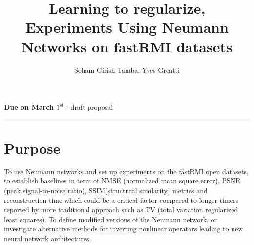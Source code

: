 \documentclass[12pt,twoside]{article}
\title{Learning to regularize, Experiments Using Neumann Networks on fastRMI datasets}
\author{Soham Girish Tamba, Yves Greatti}
\date{}
\begin{document}
\maketitle
\textbf{Due on March $1^{\text{st}}$} - draft proposal

\noindent\rule{\textwidth}{0.4pt}

\section{Purpose}
To use Neumann networks  and set up experiments on the fastRMI open datasets, 
to establish baselines in term of NMSE (normalized mean square error), PSNR (peak signal-to-noise ratio), SSIM(structural similarity) metrics and reconstruction time 
which could be a critical factor compared to longer timers reported by more traditional  approach such as TV (total variation regularized least squares).
To define modified versions of the Neumann network, or investigate alternative methods for inverting nonlinear operators leading to new neural network architectures.
\end{document}
